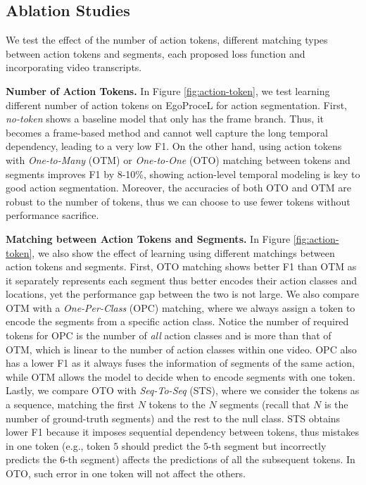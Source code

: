 \documentclass[10pt,twocolumn,letterpaper]{article}
\newcommand{\headline}[1]{\noindent \textbf{#1}}
\newcommand{\0}{\boldsymbol{0}}
\begin{document}
\subsection{Ablation Studies}
We test the effect of the number of action tokens, different matching types between action tokens and segments, each proposed loss function and incorporating video transcripts. 

\vspace{1mm}

\headline{Number of Action Tokens.}
In Figure \ref{fig:action-token}, we test learning different number of action tokens on EgoProceL for action segmentation. 
First, \textit{no-token} shows a baseline model that only has the frame branch. Thus, it becomes a frame-based method and cannot well capture the long temporal dependency, leading to a very low F1.  
On the other hand, using action tokens with \textit{One-to-Many} (OTM) or \textit{One-to-One} (OTO) matching between tokens and segments improves F1 by 8-10\%, showing action-level temporal modeling is key to good action segmentation. Moreover, the accuracies of both OTO and OTM are robust to the number of tokens, thus we can choose to use fewer tokens without performance sacrifice.

\headline{Matching between Action Tokens and Segments.} In Figure \ref{fig:action-token}, we also show the effect of learning using different matchings between action tokens and segments. 
First, OTO matching shows better F1 than OTM as it separately represents each segment thus better encodes their action classes and locations, yet the performance gap between the two is not large. 
We also compare OTM with a \emph{One-Per-Class} (OPC) matching, where we always assign a token to encode the segments from a specific action class. 
Notice the number of required tokens for OPC is the number of \textit{all} action classes and is more than that of OTM, which is linear to the number of action classes within one video. 
OPC also has a lower F1 as it always fuses the information of segments of the same action, while OTM allows the model to decide when to encode segments with one token. 
Lastly, we compare OTO with \textit{Seq-To-Seq} (STS), where we consider the tokens as a sequence, matching the first $N$ tokens to the $N$ segments (recall that $N$ is the number of ground-truth segments) and the rest to the null class. STS obtains lower F1 because it imposes sequential dependency between tokens, thus mistakes in one token (e.g., token $5$ should predict the $5$-th segment but incorrectly predicts the $6$-th segment) affects the predictions of all the subsequent tokens. In OTO, such error in one token will not affect the others.
\end{document}
